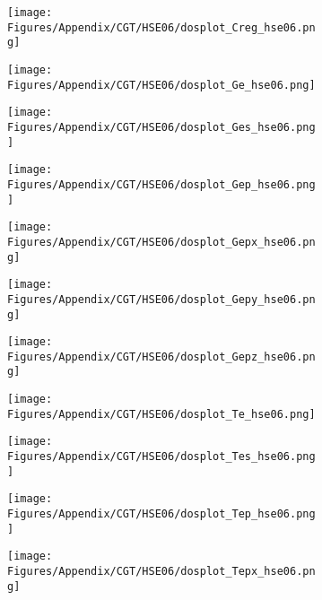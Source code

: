 \begin{figure}[H]
\begin{subfigure}{0.24\textwidth}
    \texttt{[image: Figures/Appendix/CGT/HSE06/dosplot\_Creg\_hse06.png]}
    \label{dosplot_Creg_hse06}
\end{subfigure}
\hfill
\begin{subfigure}{0.24\textwidth}
    \texttt{[image: Figures/Appendix/CGT/HSE06/dosplot\_Ge\_hse06.png]}
    \label{dosplot_Ge_hse06}
\end{subfigure}
\hfill
\begin{subfigure}{0.24\textwidth}
    \texttt{[image: Figures/Appendix/CGT/HSE06/dosplot\_Ges\_hse06.png]}
    \label{dosplot_Ges_hse06}
\end{subfigure}
\hfill
\begin{subfigure}{0.24\textwidth}
    \texttt{[image: Figures/Appendix/CGT/HSE06/dosplot\_Gep\_hse06.png]}
    \label{dosplot_Gep_hse06}
\end{subfigure}
\hfill
\begin{subfigure}{0.24\textwidth}
    \texttt{[image: Figures/Appendix/CGT/HSE06/dosplot\_Gepx\_hse06.png]}
    \label{dosplot_Gepx_hse06}
\end{subfigure}
\hfill
\begin{subfigure}{0.24\textwidth}
    \texttt{[image: Figures/Appendix/CGT/HSE06/dosplot\_Gepy\_hse06.png]}
    \label{dosplot_Gepy_hse06}
\end{subfigure}
\hfill
\begin{subfigure}{0.24\textwidth}
    \texttt{[image: Figures/Appendix/CGT/HSE06/dosplot\_Gepz\_hse06.png]}
    \label{dosplot_Gepz_hse06}
\end{subfigure}
\hfill
\begin{subfigure}{0.24\textwidth}
    \texttt{[image: Figures/Appendix/CGT/HSE06/dosplot\_Te\_hse06.png]}
    \label{dosplot_Te_hse06}
\end{subfigure}
\hfill
\begin{subfigure}{0.24\textwidth}
    \texttt{[image: Figures/Appendix/CGT/HSE06/dosplot\_Tes\_hse06.png]}
    \label{dosplot_Tes_hse06}
\end{subfigure}
\hfill
\begin{subfigure}{0.24\textwidth}
    \texttt{[image: Figures/Appendix/CGT/HSE06/dosplot\_Tep\_hse06.png]}
    \label{dosplot_Tep_hse06}
\end{subfigure}
\hfill
\begin{subfigure}{0.24\textwidth}
    \texttt{[image: Figures/Appendix/CGT/HSE06/dosplot\_Tepx\_hse06.png]}

\end{subfigure}
\end{figure}

